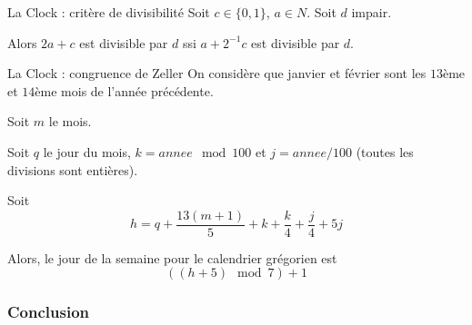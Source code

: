 \documentclass[12pt]{beamer}
\begin{document}
\begin{frame}{La Clock : critère de divisibilité}
    Soit $c \in \{0, 1\}$, $a\in N$. Soit $d$ impair.

    Alors $2a+c$ est divisible par $d$ ssi $a+2^{-1}c$ est divisible par $d$.
\end{frame}


\begin{frame}{La Clock : congruence de Zeller}
On considère que janvier et février sont les $13$ème et $14$ème mois de l'année précédente. 

Soit $m$ le mois. 

Soit $q$ le jour du mois, $k = annee \mod 100$ et $j = annee/100$ (toutes les divisions sont entières).

Soit $$h = q + \frac{13(m+1)}{5}+k+\frac{k}{4}+\frac{j}{4}+5j$$

Alors, le jour de la semaine pour le calendrier grégorien est $$((h+5)\mod 7 )+1$$
\end{frame}

\begin{frame}
\frametitle{Conclusion}

\end{frame}
\end{document}

